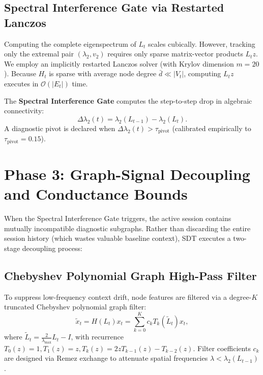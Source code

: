 \documentclass[ijds,dblanonrev]{informs4}
\begin{document}
\subsection{Spectral Interference Gate via Restarted Lanczos}
Computing the complete eigenspectrum of $L_t$ scales cubically. However, tracking only the extremal pair $(\lambda_2, v_2)$ requires only sparse matrix-vector products $L_t z$. We employ an implicitly restarted Lanczos solver (with Krylov dimension $m = 20$). Because $H_t$ is sparse with average node degree $\bar{d} \ll |V_t|$, computing $L_t z$ executes in $\mathcal{O}(|E_t|)$ time.

The \textbf{Spectral Interference Gate} computes the step-to-step drop in algebraic connectivity:
\begin{equation}
  \Delta \lambda_2(t) = \lambda_2(L_{t-1}) - \lambda_2(L_t).
  \label{eq:gate_metric}
\end{equation}
A diagnostic pivot is declared when $\Delta \lambda_2(t) > \tau_{\text{pivot}}$ (calibrated empirically to $\tau_{\text{pivot}} = 0.15$).

\section{Phase 3: Graph-Signal Decoupling and Conductance Bounds}
\label{sec:phase3}

When the Spectral Interference Gate triggers, the active session contains mutually incompatible diagnostic subgraphs. Rather than discarding the entire session history (which wastes valuable baseline context), SDT executes a two-stage decoupling process:

\subsection{Chebyshev Polynomial Graph High-Pass Filter}
To suppress low-frequency context drift, node features are filtered via a degree-$K$ truncated Chebyshev polynomial graph filter:
\begin{equation}
  \tilde{x}_t = H(L_t) x_t = \sum_{k=0}^K c_k T_k(\tilde{L}_t) x_t,
  \label{eq:chebyshev_filter}
\end{equation}
where $\tilde{L}_t = \frac{2}{\lambda_{\max}} L_t - I$, with recurrence $T_0(z) = 1, T_1(z) = z, T_k(z) = 2z T_{k-1}(z) - T_{k-2}(z)$. Filter coefficients $c_k$ are designed via Remez exchange to attenuate spatial frequencies $\lambda < \lambda_2(L_{t-1})$.
\end{document}
